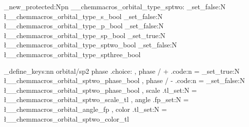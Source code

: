 \cs_new_protected:Npn \__chemmacros_orbital_type_sptwo:
  {
    \bool_set_false:N \l__chemmacros_orbital_type_s_bool
    \bool_set_false:N \l__chemmacros_orbital_type_p_bool
    \bool_set_false:N \l__chemmacros_orbital_type_sp_bool
    \bool_set_true:N  \l__chemmacros_orbital_type_sptwo_bool
    \bool_set_false:N \l__chemmacros_orbital_type_spthree_bool
  }

\chemmacros_define_keys:nn {orbital/sp2}
  {
    phase .choice: ,
    phase / + .code:n =
      { \bool_set_true:N \l__chemmacros_orbital_sptwo_phase_bool } ,
    phase / - .code:n =
      { \bool_set_false:N \l__chemmacros_orbital_sptwo_phase_bool } ,
    scale .tl_set:N   = \l__chemmacros_orbital_sptwo_scale_tl ,
    angle .fp_set:N   = \l__chemmacros_orbital_angle_fp ,
    color .tl_set:N   = \l__chemmacros_orbital_sptwo_color_tl
  }

